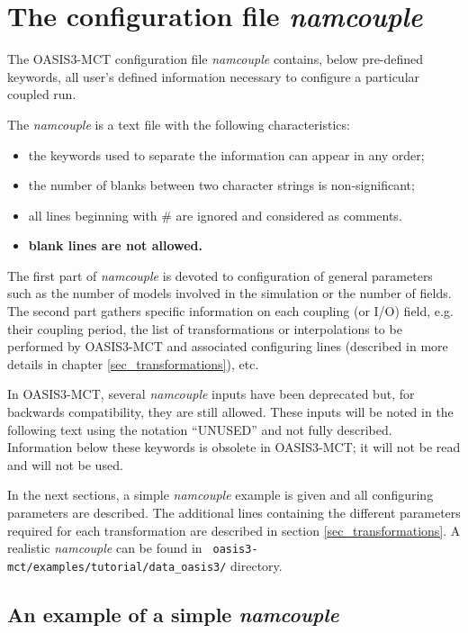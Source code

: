 \newpage
\chapter{The configuration file {\it namcouple}}
\label{sec_namcouple}

The OASIS3-MCT configuration file {\it namcouple} contains, below
pre-defined keywords, all user's
defined information necessary to configure a particular coupled
run. 

The {\it namcouple} is a text file with the following
characteristics:

\begin{itemize}
\item the keywords used to separate the information
can appear in any order;
\item the number of blanks between two character strings is
non-significant; 
\item all lines beginning with \# are ignored and considered as
comments.
\item {\bf blank lines are not allowed.}
\end{itemize}

The first part of {\it namcouple } is devoted to configuration of
general parameters such as the number of models involved in the
simulation or the number of fields.
The second part gathers specific information on each coupling (or I/O)
field, e.g. their coupling period, the list of transformations or
interpolations to be performed by OASIS3-MCT and associated
configuring lines (described in more details in chapter
\ref{sec_transformations}), etc.

In OASIS3-MCT, several {\it namcouple} inputs have been deprecated but, for backwards compatibility, they are still 
allowed.  These inputs will be noted in the following text using the
notation ``UNUSED'' and not fully described. Information below these keywords is
  obsolete in OASIS3-MCT; it will not be read and will not be used. 

In the next sections, a simple {\it namcouple} example is given and
all configuring parameters are described. The additional lines
containing the different parameters required for each transformation
are described in section \ref{sec_transformations}. A
realistic {\it namcouple} can be found in 
{\tt
oasis3-mct/examples/tutorial/data\_oasis3/} directory.

\section{An example of a simple {\it namcouple}}
\label{subsec_examplenamcouple}

